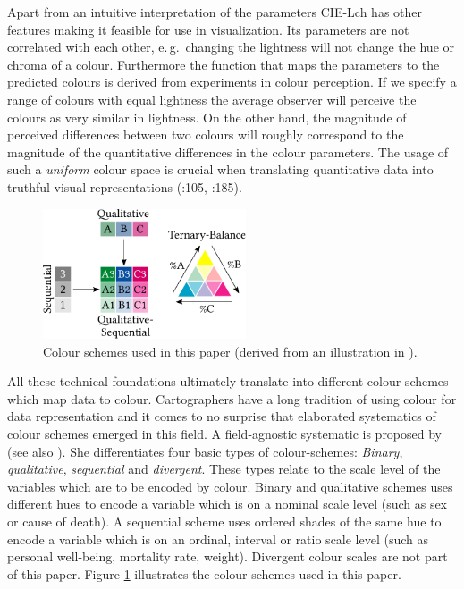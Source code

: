 \documentclass[a4paper, 12pt]{scrartcl}
\begin{document}
Apart from an intuitive interpretation of the parameters CIE-Lch has other features making it feasible for use in visualization. Its parameters are not correlated with each other, e.\,g.~changing the lightness will not change the hue or chroma of a colour. Furthermore the function that maps the parameters to the predicted colours is derived from experiments in colour perception. If we specify a range of colours with equal lightness the average observer will perceive the colours as very similar in lightness. On the other hand, the magnitude of perceived differences between two colours will roughly correspond to the magnitude of the quantitative differences in the colour parameters. The usage of such a \emph{uniform} colour space is crucial when translating quantitative data into truthful visual representations (\cite{Ware2013}:105, \cite{Fairchild2005}:185).

\begin{figure}
  \centering
  \includegraphics[width = 6cm]{../fig/brewer_subset.pdf}
  \caption{Colour schemes used in this paper (derived from an illustration in \cite{Brewer1994a}).}
  \label{fig:brewer}
\end{figure}

All these technical foundations ultimately translate into different colour schemes which map data to colour. Cartographers have a long tradition of using colour for data representation and it comes to no surprise that elaborated systematics of colour schemes emerged in this field. A field-agnostic systematic is proposed by \textcite{Brewer1994a} (see also \cite{Brewer1994}). She differentiates four basic types of colour-schemes: \emph{Binary}, \emph{qualitative}, \emph{sequential} and \emph{divergent}. These types relate to the scale level of the variables which are to be encoded by colour. Binary and qualitative schemes uses different hues to encode a variable which is on a nominal scale level (such as sex or cause of death). A sequential scheme uses ordered shades of the same hue to encode a variable which is on an ordinal, interval or ratio scale level (such as personal well-being, mortality rate, weight). Divergent colour scales are not part of this paper. Figure \ref{fig:brewer} illustrates the colour schemes used in this paper.
\end{document}
